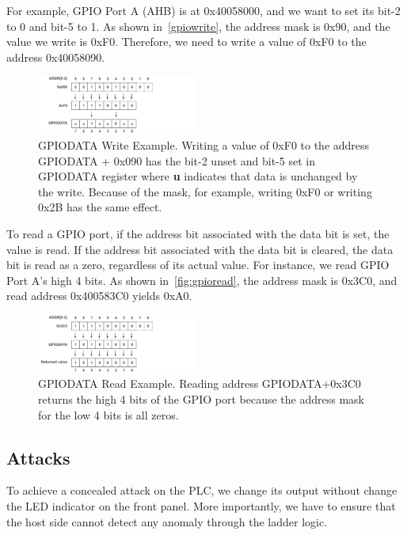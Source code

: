 For example, GPIO Port A (AHB) is at 0x40058000, and we want to set its bit-2 to 0 and bit-5 to 1. As shown in~\autoref{gpiowrite}, the address mask is 0x90, and the value we write is 0xF0.  Therefore, we need to write a value of 0xF0 to the address 0x40058090.

\begin{figure}[th]
	\includegraphics[width=0.47\textwidth]{figures/gpiowrite2}
	\centering
	\caption{GPIODATA Write Example. Writing a value of 0xF0 to the address GPIODATA + 0x090 has the bit-2 unset and bit-5 set in GPIODATA register where \textbf{u} indicates that data is unchanged by the write. Because of the mask, for example, writing 0xF0 or writing 0x2B has the same effect.}
	\label{fig:gpiowrite}
\end{figure}



To read a GPIO port, if the address bit associated with the data bit is set, the value is read. If the address bit associated with the data bit is cleared, the data bit is read as a zero, regardless of its actual value. For instance, we read GPIO Port A's high 4 bits. As shown in~\autoref{fig:gpioread}, the address mask is 0x3C0, and read address 0x400583C0 yields 0xA0.


\begin{figure}[th]
	\includegraphics[width=0.47\textwidth]{figures/gpioread2}
	\centering
	\caption{GPIODATA Read Example. Reading address GPIODATA+0x3C0 returns the high 4 bits of the GPIO port because the address mask for the low 4 bits is all zeros.}
	\label{fig:gpioread}
\end{figure}



\subsection{Attacks}

To achieve a concealed attack on the PLC, we change its output without change the LED indicator on the front panel. More importantly, we have to ensure that the host side cannot detect any anomaly through the ladder logic.

